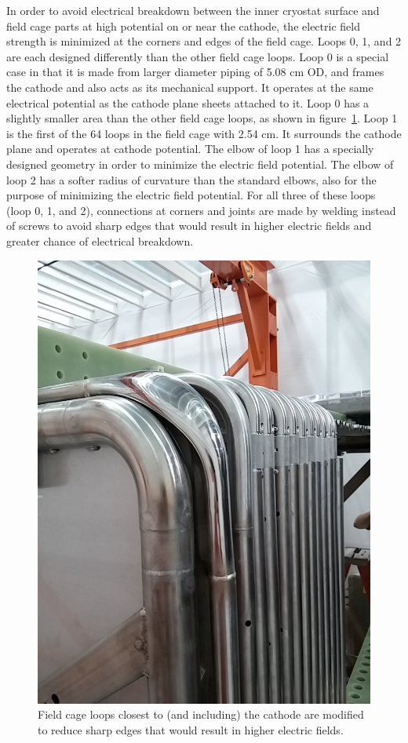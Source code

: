 In order to avoid electrical breakdown between the inner cryostat surface and field cage parts at high potential on or near the cathode, the electric field strength is minimized at the corners and edges of the field cage. Loops 0, 1, and 2 are each designed differently than the other field cage loops.  Loop 0 is a special case in that it is made from larger diameter piping of 5.08 cm OD, and frames the cathode and also acts as its mechanical support.  It operates at the same electrical potential as the cathode plane sheets attached to it.  Loop 0 has a slightly smaller area than the other field cage loops, as shown in figure~\ref{fig:tpc-smooshed-elbow}.  Loop 1 is the first of the 64 loops in the field cage with 2.54 cm.  It surrounds the cathode plane and operates at cathode potential.  The elbow of loop 1 has a specially designed geometry in order to minimize the electric field potential.  The elbow of loop 2 has a softer radius of curvature than the standard elbows, also for the purpose of minimizing the electric field potential. For all three of these loops (loop 0, 1, and 2), connections at corners and joints are made by welding instead of screws to avoid sharp edges that would result in higher electric fields and greater chance of electrical breakdown.

\begin{figure}
\centering	
\includegraphics[width=0.7\linewidth]{figures/tpc-smooshed-elbow-3.jpg}
\caption{Field cage loops closest to (and including) the cathode are modified to reduce sharp edges that would result in higher electric fields.}
\label{fig:tpc-smooshed-elbow}
\end{figure}

